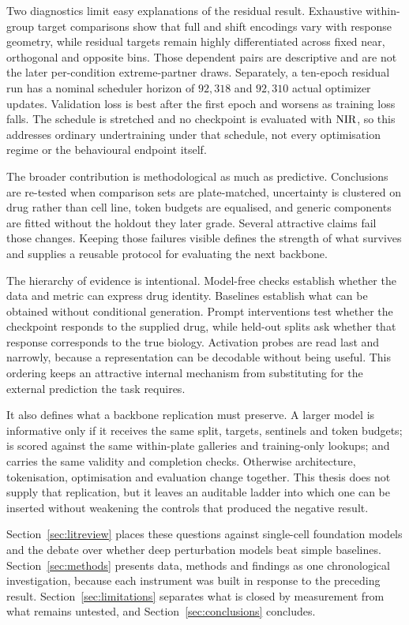 Two diagnostics limit easy explanations of the residual result. Exhaustive within-group target
comparisons show that full and shift encodings vary with response geometry, while residual targets
remain highly differentiated across fixed near, orthogonal and opposite bins. Those dependent pairs
are descriptive and are not the later per-condition extreme-partner draws. Separately, a ten-epoch
residual run has a nominal scheduler horizon of $92{,}318$ and $92{,}310$ actual optimizer updates.
Validation loss is best after the first epoch and worsens as training loss falls. The schedule is
stretched and no checkpoint is evaluated with $\textrm{NIR}$, so this addresses ordinary undertraining
under that schedule, not every optimisation regime or the behavioural endpoint itself.

The broader contribution is methodological as much as predictive. Conclusions are re-tested when
comparison sets are plate-matched, uncertainty is clustered on drug rather than cell line, token
budgets are equalised, and generic components are fitted without the holdout they later grade.
Several attractive claims fail those changes. Keeping those failures visible defines the strength
of what survives and supplies a reusable protocol for evaluating the next backbone.

The hierarchy of evidence is intentional. Model-free checks establish whether the data and metric
can express drug identity. Baselines establish what can be obtained without conditional generation.
Prompt interventions test whether the checkpoint responds to the supplied drug, while held-out
splits ask whether that response corresponds to the true biology. Activation probes are read last
and narrowly, because a representation can be decodable without being useful. This ordering keeps
an attractive internal mechanism from substituting for the external prediction the task requires.

It also defines what a backbone replication must preserve. A larger model is informative only if it
receives the same split, targets, sentinels and token budgets; is scored against the same
within-plate galleries and training-only lookups; and carries the same validity and completion
checks. Otherwise architecture, tokenisation, optimisation and evaluation change together. This
thesis does not supply that replication, but it leaves an auditable ladder into which one can be
inserted without weakening the controls that produced the negative result.

Section~\ref{sec:litreview} places these questions against single-cell foundation models and the
debate over whether deep perturbation models beat simple baselines. Section~\ref{sec:methods}
presents data, methods and findings as one chronological investigation, because each instrument was
built in response to the preceding result. Section~\ref{sec:limitations} separates what is closed
by measurement from what remains untested, and Section~\ref{sec:conclusions} concludes.
